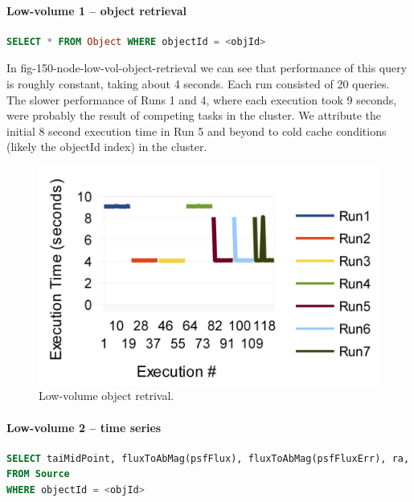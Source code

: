 \documentclass[DM,lsstdraft,toc]{lsstdoc}
\begin{document}
\paragraph{Low-volume 1 -- object
retrieval}\label{low-volume-1-object-retrieval}

\begin{lstlisting}[language=SQL]
SELECT * FROM Object WHERE objectId = <objId>
\end{lstlisting}

In fig-150-node-low-vol-object-retrieval we can see that performance of
this query is roughly constant, taking about 4 seconds. Each run
consisted of 20 queries. The slower performance of Runs 1 and 4, where
each execution took 9 seconds, were probably the result of competing
tasks in the cluster. We attribute the initial 8 second execution time
in Run 5 and beyond to cold cache conditions (likely the objectId index)
in the cluster.

\begin{figure}[H]
\centering
\includegraphics{_static/150_node_low_vol_object_retrieval.png}
\caption{Low-volume object retrival.}
\end{figure}

\paragraph{Low-volume 2 -- time series}\label{low-volume-2-time-series}

\begin{lstlisting}[language=SQL]
SELECT taiMidPoint, fluxToAbMag(psfFlux), fluxToAbMag(psfFluxErr), ra, decl
FROM Source
WHERE objectId = <objId>
\end{lstlisting}
\end{document}
